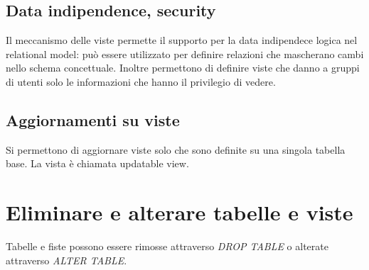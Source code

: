\subsection{Data indipendence, security}
Il meccanismo delle viste permette il supporto per la data indipendece logica nel relational model: pu\`o essere utilizzato per definire relazioni che mascherano cambi nello schema concettuale. Inoltre 
permettono di definire viste che danno a gruppi di utenti solo le informazioni che hanno il privilegio di vedere. 
\subsection{Aggiornamenti su viste}
Si permettono di aggiornare viste solo che sono definite su una singola tabella base. La vista \`e chiamata updatable view. 
\section{Eliminare e alterare tabelle e viste}
Tabelle e fiste possono essere rimosse attraverso \emph{DROP TABLE} o alterate attraverso \emph{ALTER TABLE}.